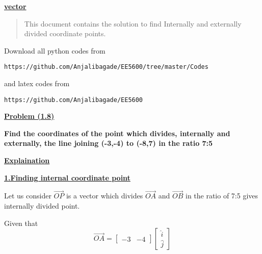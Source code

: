 \documentclass[journal,12pt,twocolumn]{IEEEtran}
\begin{document}
%
\newcommand*\mycirc[1]{%
   \begin{tikzpicture}
     \node[draw,circle,inner sep=1pt,color=blue ] {#1};
   \end{tikzpicture}}
\vspace{2ex}
\begin{center}
{\underline{\Large \bf vector}}
\end{center}
\begin{abstract}
This document contains the solution to find Internally and externally divided coordinate points.
\end{abstract}
Download all python codes from 
%
\begin{lstlisting}
https://github.com/Anjalibagade/EE5600/tree/master/Codes
\end{lstlisting}
%
and latex codes from 
%
\begin{lstlisting}
https://github.com/Anjalibagade/EE5600
\end{lstlisting}
%
%
\maketitle
\begin{center}
{\underline{\Large\bf Problem (1.8)}}
\end{center}


\bf{Find the coordinates of the point which divides, internally and externally, the line joining (-3,-4) to (-8,7) in the ratio 7:5}


\maketitle
\begin{center}
{\underline{\Large\bf Explaination}} 
\end{center}
{\underline{\bf 1.Finding internal coordinate point}}

Let us consider
$\overrightarrow{OP}$ is a vector which divides $\overrightarrow{OA}$ and $\overrightarrow{OB}$ in the ratio of 7:5 gives internally divided point.

Given that
\begin{equation}
 \overrightarrow{OA} = 
 \begin{bmatrix}
 -3 & -4 
 \end{bmatrix}
 \begin{bmatrix}
 \hat{i}\\
 \hat{j}
 \end{bmatrix}
\end{equation}
\end{document}

